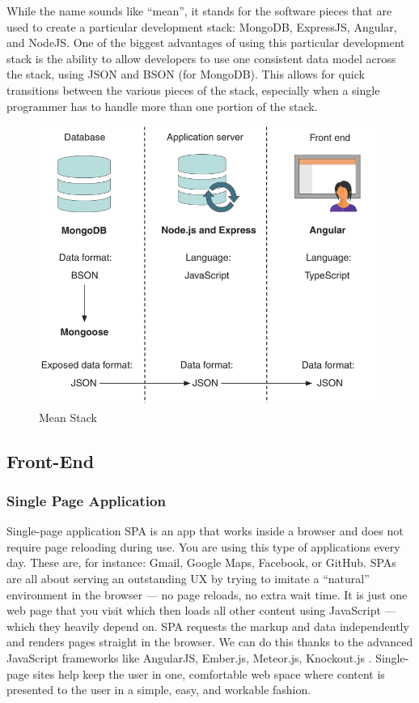 While the name sounds like “mean”, it stands for the software pieces that are used to create a particular development stack: MongoDB, ExpressJS, Angular, and NodeJS. One of the biggest advantages of using this particular development stack is the ability to allow developers to use one consistent data model across the stack, using \ac{JSON} and BSON (for MongoDB). This allows for quick transitions between the various pieces of the stack, especially when a single programmer has to handle more than one portion of the stack.

\begin{figure}[!ht]
      \center
      \includegraphics[scale=0.60]{assets/mean.png}
      \caption{Mean Stack}
      \label{fig:mean}
\end{figure}
\subsection{Front-End}
\subsubsection{Single Page Application}
Single-page application \ac{SPA} is an app that works inside a browser and does not require page reloading during use. You are using this type of applications every day. These are, for instance: Gmail, Google Maps, Facebook, or GitHub.
SPAs are all about serving an outstanding UX by trying to imitate a “natural” environment in the browser — no page reloads, no extra wait time. It is just one web page that you visit which then loads all other content using JavaScript — which they heavily depend on.
SPA requests the markup and data independently and renders pages straight in the browser. We can do this thanks to the advanced JavaScript frameworks like AngularJS, Ember.js, Meteor.js, Knockout.js .
Single-page sites help keep the user in one, comfortable web space where content is presented to the user in a simple, easy, and workable fashion.

